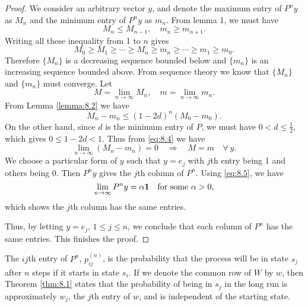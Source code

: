 \begin{proof}
We consider an arbitrary vector $y$, and denote the maximum entry of $P^n y$ as $M_n$ and the minimum entry of $P^n y$ as $m_n$. From lemma 1, we must have 
\begin{equation*}
    M_n \leq M_{n-1}, \quad m_n \geq m_{n+1}.
\end{equation*}
Writing all these inequality from 1 to $n$ gives
\begin{equation*}
    M_0 \geq M_1 \geq \cdots \geq M_n \geq m_n \geq \cdots \geq m_1 \geq m_0.
\end{equation*}
Therefore $\{M_n\}$ is a decreasing sequence bounded below and $\{m_n\}$ is an increasing sequence bounded above. From sequence theory we know that $\{ M_n \}$ and $\{m_n\}$ must converge. Let
\begin{equation*}
    M = \lim_{n\to\infty} M_n, \quad m = \lim_{n\to\infty} m_n.
\end{equation*}
From Lemma \ref{lemma:8.2} we have 
\begin{equation}
    \label{eq:8.4}
    \tag{8-4}
    M_n - m_n \leq (1-2d)^n (M_0 - m_0).
\end{equation}
On the other hand, since $d$ is the minimum entry of $P$, we must have $0 < d \leq \frac{1}{2}$, which gives $0 \leq 1-2d < 1$. Thus from \eqref{eq:8.4} we have 
\begin{equation}
    \label{eq:8.5}
    \tag{8-5}
    \lim_{n\to\infty} (M_n - m_n) = 0 \quad \Rightarrow \quad 
    M=m \quad \forall \ y.
\end{equation}
We choose a particular form of $y$ such that $y = e_j$ with $j$th entry being 1 and others being 0. Then $P^n y$ gives the $j$th column of $P^n$. Using \eqref{eq:8.5}, we have
\begin{equation*}
    \lim_{n\to\infty} P^n y = \alpha \mathbf{1} \quad \text{for some $\alpha > 0$},
\end{equation*}
which shows the $j$th column has the same entries.

Thus, by letting $y = e_j$, $1\leq j \leq n$, we conclude that each column of $P^n$ has the same entries. This finishes the proof.
\end{proof}

The $ij$th entry of $P^n$, $p^{(n)}_{ij}$, is the probability that the process will be in state $s_j$ after $n$ steps if it starts in state $s_i$. If we denote the common row of $W$ by $w$, then Theorem \ref{thm:8.1} states that the probability of being in $s_j$ in the long run is approximately $w_j$, the $j$th entry of $w$, and is independent of the starting state. 

